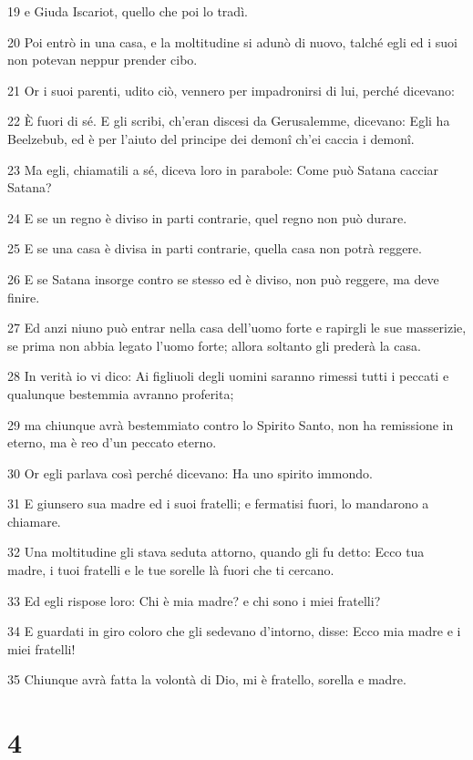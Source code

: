 \par 19 e Giuda Iscariot, quello che poi lo tradì.
\par 20 Poi entrò in una casa, e la moltitudine si adunò di nuovo, talché egli ed i suoi non potevan neppur prender cibo.
\par 21 Or i suoi parenti, udito ciò, vennero per impadronirsi di lui, perché dicevano:
\par 22 È fuori di sé. E gli scribi, ch'eran discesi da Gerusalemme, dicevano: Egli ha Beelzebub, ed è per l'aiuto del principe dei demonî ch'ei caccia i demonî.
\par 23 Ma egli, chiamatili a sé, diceva loro in parabole: Come può Satana cacciar Satana?
\par 24 E se un regno è diviso in parti contrarie, quel regno non può durare.
\par 25 E se una casa è divisa in parti contrarie, quella casa non potrà reggere.
\par 26 E se Satana insorge contro se stesso ed è diviso, non può reggere, ma deve finire.
\par 27 Ed anzi niuno può entrar nella casa dell'uomo forte e rapirgli le sue masserizie, se prima non abbia legato l'uomo forte; allora soltanto gli prederà la casa.
\par 28 In verità io vi dico: Ai figliuoli degli uomini saranno rimessi tutti i peccati e qualunque bestemmia avranno proferita;
\par 29 ma chiunque avrà bestemmiato contro lo Spirito Santo, non ha remissione in eterno, ma è reo d'un peccato eterno.
\par 30 Or egli parlava così perché dicevano: Ha uno spirito immondo.
\par 31 E giunsero sua madre ed i suoi fratelli; e fermatisi fuori, lo mandarono a chiamare.
\par 32 Una moltitudine gli stava seduta attorno, quando gli fu detto: Ecco tua madre, i tuoi fratelli e le tue sorelle là fuori che ti cercano.
\par 33 Ed egli rispose loro: Chi è mia madre? e chi sono i miei fratelli?
\par 34 E guardati in giro coloro che gli sedevano d'intorno, disse: Ecco mia madre e i miei fratelli!
\par 35 Chiunque avrà fatta la volontà di Dio, mi è fratello, sorella e madre.

\chapter{4}


